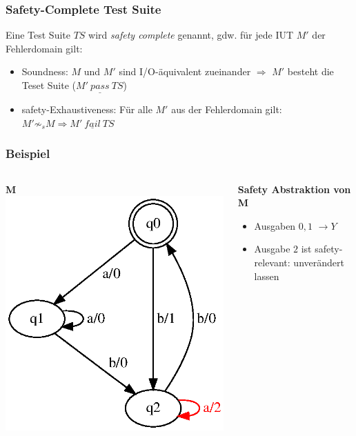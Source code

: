 \documentclass[10pt]{beamer}
\begin{document}
\begin{frame}
\frametitle{Safety-Complete Test Suite}
Eine Test Suite $TS$ wird \emph{safety complete} genannt, gdw. für jede IUT $M'$ der Fehlerdomain gilt:
\begin{itemize}
  \item<1-> Soundness: $M$ und $M'$ sind I/O-äquivalent zueinander $\Rightarrow$ $M'$ besteht die Teset Suite ($M'~ \underline{pass}~ TS$)
  \item<2-> safety-Exhaustiveness: Für alle $M'$ aus der Fehlerdomain gilt: $M' \not \sim_s M \Rightarrow M'~ \underline{fail}~ TS$
\end{itemize}
\end{frame}

\begin{frame}
\frametitle{Beispiel}
\begin{columns}[T] %

\begin{column}{.50\textwidth}
\textbf{M}
\includegraphics[width=\textwidth]{images/fsm-example01}
\end{column}%

\begin{column}{.50\textwidth}
\textbf{Safety Abstraktion von M}\\
\begin{itemize}
\item Ausgaben $0,1$  $\rightarrow Y$
\item Ausgabe $2$ ist safety-relevant: unverändert lassen
\end{itemize}
\end{column}%
\end{columns}
\end{frame}
\end{document}
